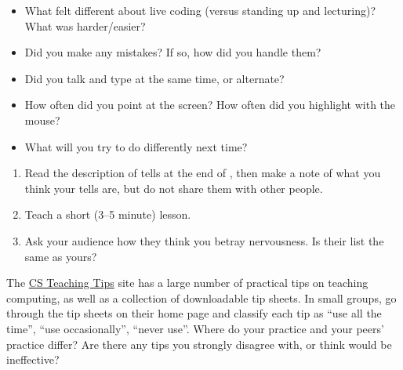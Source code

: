\begin{itemize}
\item
  What felt different about live coding (versus standing up and
  lecturing)? What was harder/easier?
\item
  Did you make any mistakes? If so, how did you handle them?
\item
  Did you talk and type at the same time, or alternate?
\item
  How often did you point at the screen? How often did you highlight
  with the mouse?
\item
  What will you try to do differently next time?
\end{itemize}


\begin{enumerate}

  \item
    Read the description of tells at the end of
    , then make a note of what you
    think your tells are, but do not share them with other people.

  \item
    Teach a short (3--5 minute) lesson.

  \item
    Ask your audience how they think you betray nervousness.  Is their
    list the same as yours?

\end{enumerate}


The \href{http://csteachingtips.org/}{CS Teaching Tips} site has a
large number of practical tips on teaching computing, as well as a
collection of downloadable tip sheets.  In small groups, go through
the tip sheets on their home page and classify each tip as ``use all
the time'', ``use occasionally'', ``never use''.  Where do your
practice and your peers' practice differ?  Are there any tips you
strongly disagree with, or think would be ineffective?
